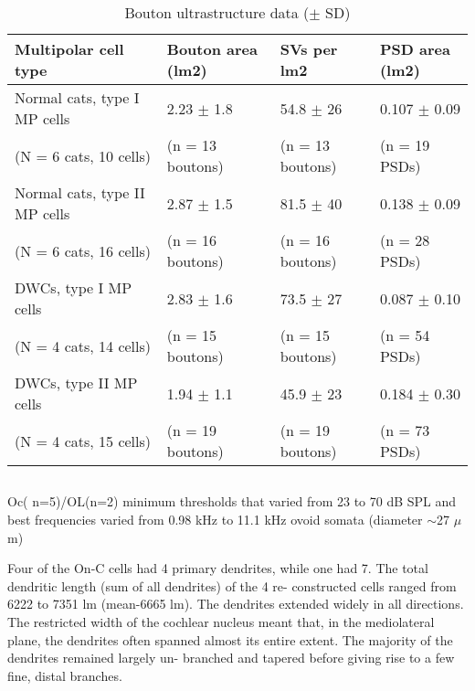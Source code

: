 \documentclass[10pt,a4paper]{article}
\begin{document}
\begin{table}[h]
\caption{Bouton ultrastructure data ($\pm$ SD) \citep[Table 2 in ][]{ReddCahillEtAl:2002}}
\begin{tabularx}{\textwidth}{XXXX} \toprule
Multipolar cell type           &  Bouton area (lm2)         &    SVs per lm2                   &     PSD area (lm2) \\ \midrule
Normal cats, type I MP cells   &  2.23  $\pm$     1.8       &    54.8  $\pm$   26              &     0.107  $\pm$     0.09 \\
(N = 6 cats, 10 cells)         &  (n    =     13 boutons)   &    (n     =       13  boutons)   &     (n      =        19 PSDs) \\
Normal cats, type II MP cells  &  2.87  $\pm$     1.5       &    81.5  $\pm$   40              &     0.138  $\pm$     0.09 \\(N = 6 cats, 16 cells)         &  (n    =     16 boutons)   &    (n     =       16  boutons)   &     (n      =        28 PSDs)\\        
DWCs, type I MP cells          &  2.83  $\pm$     1.6       &    73.5  $\pm$   27              &     0.087  $\pm$     0.10 \\(N = 4 cats, 14 cells)         &  (n    =     15 boutons)   &    (n     =       15  boutons)   &     (n      =        54 PSDs)\\        
DWCs, type II MP cells         &  1.94  $\pm$     1.1       &    45.9  $\pm$   23              &     0.184  $\pm$     0.30 \\           
(N = 4 cats, 15 cells)         &  (n   =      19 boutons)   &    (n     =       19 boutons)    &     (n      =        73 PSDs)\\
\bottomrule  
\end{tabularx}
\end{table}




\subsection{\citep{ArnottWallaceEtAl:2003}}
Oc( n=5)/OL(n=2) minimum thresholds that varied from 23 to 70 dB SPL and best frequencies varied from 0.98 kHz to 11.1 kHz
ovoid somata (diameter $\sim$27 $\mu$m) 

Four of the On-C cells had 4 primary dendrites, while one had 7. The total
dendritic length (sum of all dendrites) of the 4 re- constructed cells ranged
from 6222 to 7351 lm (mean-6665 lm). The dendrites extended widely in all
directions. The restricted width of the cochlear nucleus meant that, in the
mediolateral plane, the dendrites often spanned almost its entire extent. The
majority of the dendrites remained largely un- branched and tapered before
giving rise to a few fine, distal branches.
\end{document}
